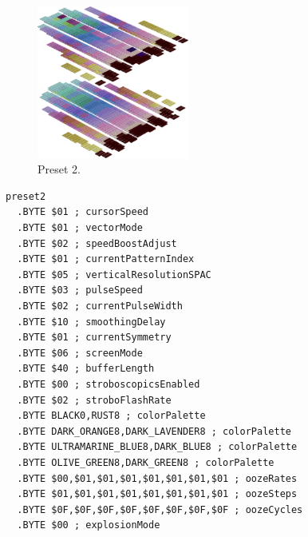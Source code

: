 \vspace*{0.5cm}
\begin{minipage}[b]{0.48\linewidth}
\begin{figure}[H]                                                          
  \centering                                                             
  \begin{adjustbox}{width=5cm,center}                                   
  \includegraphics[width=5cm]{src/colorspace_presets/preset2-45.png}%
  \end{adjustbox}                                                        
\caption*{Preset 2.}                                           
\end{figure}                                                               
\end{minipage}
\hspace{0.1cm}
\begin{minipage}[b]{0.48\linewidth}                                                                         
\begin{lstlisting}[basicstyle=\ttfamily\tiny]
preset2
  .BYTE $01 ; cursorSpeed
  .BYTE $01 ; vectorMode
  .BYTE $02 ; speedBoostAdjust
  .BYTE $01 ; currentPatternIndex
  .BYTE $05 ; verticalResolutionSPAC
  .BYTE $03 ; pulseSpeed
  .BYTE $02 ; currentPulseWidth
  .BYTE $10 ; smoothingDelay
  .BYTE $01 ; currentSymmetry
  .BYTE $06 ; screenMode
  .BYTE $40 ; bufferLength
  .BYTE $00 ; stroboscopicsEnabled
  .BYTE $02 ; stroboFlashRate
  .BYTE BLACK0,RUST8 ; colorPalette
  .BYTE DARK_ORANGE8,DARK_LAVENDER8 ; colorPalette
  .BYTE ULTRAMARINE_BLUE8,DARK_BLUE8 ; colorPalette
  .BYTE OLIVE_GREEN8,DARK_GREEN8 ; colorPalette
  .BYTE $00,$01,$01,$01,$01,$01,$01,$01 ; oozeRates
  .BYTE $01,$01,$01,$01,$01,$01,$01,$01 ; oozeSteps
  .BYTE $0F,$0F,$0F,$0F,$0F,$0F,$0F,$0F ; oozeCycles
  .BYTE $00 ; explosionMode
\end{lstlisting}
\end{minipage}


